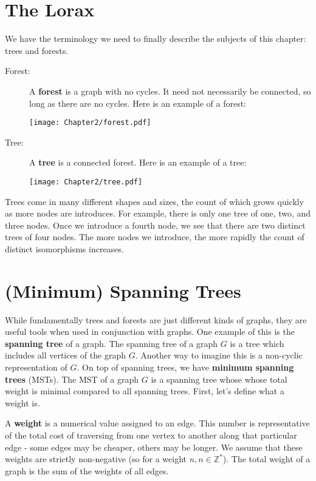 \section{The Lorax}
We have the terminology we need to finally describe the subjects of this chapter: trees and forests. 
\begin{description}
    \item[Forest:] A \textbf{forest} is a graph with no cycles. It need not necessarily be connected, so long as there are no cycles. Here is an example of a forest:
    \begin{center}
        \texttt{[image: Chapter2/forest.pdf]}
    \end{center} 
    \item[Tree:] A \textbf{tree} is a connected forest. Here is an example of a tree:
    \begin{center}
        \texttt{[image: Chapter2/tree.pdf]}
    \end{center} 
\end{description}
Trees come in many different shapes and sizes, the count of which grows quickly as more nodes are introduces. For example, there is only one tree of one, two, and three nodes. Once we introduce a fourth node, we see that there are two distinct trees of four nodes. The more nodes we introduce, the more rapidly the count of distinct isomorphisms increases. 

\section{(Minimum) Spanning Trees}
While fundamentally trees and forests are just different kinds of graphs, they are useful tools when used in conjunction with graphs. One example of this is the \textbf{spanning tree} of a graph. The spanning tree of a graph $G$ is a tree which includes all vertices of the graph $G$. Another way to imagine this is a non-cyclic representation of $G$. On top of spanning trees, we have \textbf{minimum spanning trees} (MSTs). The MST of a graph $G$ is a spanning tree whose whose total weight is minimal compared to all spanning trees. First, let's define what a weight is.

A \textbf{weight} is a numerical value assigned to an edge. This number is representative of the total cost of traversing from one vertex to another along that particular edge - some edges may be cheaper, others may be longer. We assume that these weights are strictly non-negative (so for a weight $n, n \in \mathbb{Z}^*$). The total weight of a graph is the sum of the weights of all edges.

